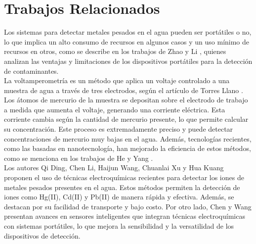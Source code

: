 \section{Trabajos Relacionados}

Los sistemas para detectar metales pesados en el agua pueden ser portátiles o no, lo que implica un alto consumo de recursos en algunos casos y un uso mínimo de recursos en otros, como se describe en los trabajos de Zhao y Li \cite{zhao2019}, quienes analizan las ventajas y limitaciones de los dispositivos portátiles para la detección de contaminantes. \\

La voltamperometría es un método que aplica un voltaje controlado a una muestra de agua a través de tres electrodos, según el artículo de Torres Llano \cite{torres2015}. Los átomos de mercurio de la muestra se depositan sobre el electrodo de trabajo a medida que aumenta el voltaje, generando una corriente eléctrica. Esta corriente cambia según la cantidad de mercurio presente, lo que permite calcular su concentración. Este proceso es extremadamente preciso y puede detectar concentraciones de mercurio muy bajas en el agua. Además, tecnologías recientes, como las basadas en nanotecnología, han mejorado la eficiencia de estos métodos, como se menciona en los trabajos de He y Yang \cite{he2020}. \\

Los autores Qi Ding, Chen Li, Haijun Wang, Chuanlai Xu y Hua Kuang \cite{ding2021} proponen el uso de técnicas electroquímicas recientes para detectar los iones de metales pesados presentes en el agua. Estos métodos permiten la detección de iones como Hg(II), Cd(II) y Pb(II) de manera rápida y efectiva. Además, se destacan por su facilidad de transporte y bajo costo. Por otro lado, Chen y Wang \cite{chen2018} presentan avances en sensores inteligentes que integran técnicas electroquímicas con sistemas portátiles, lo que mejora la sensibilidad y la versatilidad de los dispositivos de detección.
